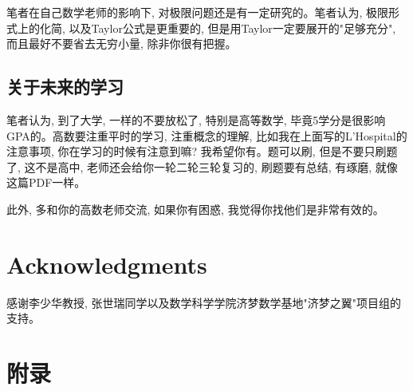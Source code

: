 \documentclass[10pt]{SelfArx} %
\numberwithin{dummy}{section}
\begin{document}
笔者在自己数学老师的影响下, 对极限问题还是有一定研究的。笔者认为, 极限形式上的化简, 以及Taylor公式是更重要的, 但是用Taylor一定要展开的"足够充分", 而且最好不要省去无穷小量, 除非你很有把握。
\subsection{关于未来的学习}
笔者认为, 到了大学, 一样的不要放松了, 特别是高等数学, 毕竟5学分是很影响GPA的。高数要注重平时的学习, 注重概念的理解, 比如我在上面写的L'Hospital的注意事项, 你在学习的时候有注意到嘛? 我希望你有。题可以刷, 但是不要只刷题了, 这不是高中, 老师还会给你一轮二轮三轮复习的, 刷题要有总结, 有琢磨, 就像这篇PDF一样。

此外, 多和你的高数老师交流, 如果你有困惑, 我觉得你找他们是非常有效的。
\section*{Acknowledgments} %


感谢李少华教授, 张世瑞同学以及数学科学学院济梦数学基地"济梦之翼"项目组的支持。
\section*{附录}
\begin{figure}[h]
	\centering
\end{figure}


%

\end{document}
